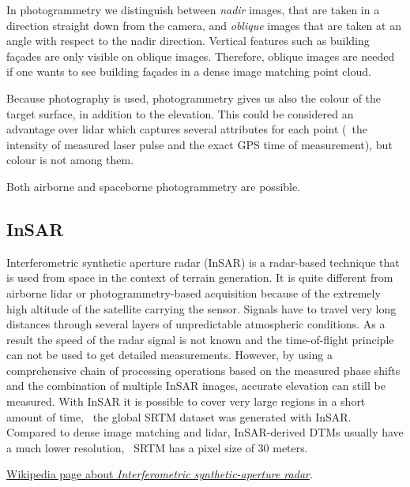 In photogrammetry we distinguish between \emph{nadir} images, 
that are taken in a direction straight down from the camera, and \emph{oblique}
images that are taken at an angle with respect to the nadir direction.
Vertical features such as building façades are only visible on oblique images.
Therefore, oblique images are needed if one wants to see building façades in a dense image matching point cloud.

Because photography is used, photogrammetry gives us also the colour of the target surface, in addition to the elevation.
This could be considered an advantage over lidar which captures several attributes for each point (\eg\ the intensity of measured laser pulse and the exact GPS time of measurement), but colour is not among them.

Both airborne and spaceborne photogrammetry are possible.

\subsection{InSAR}

Interferometric synthetic aperture radar (InSAR) is a radar-based technique that is used from space in the context of terrain generation. 
It is quite different from airborne lidar or photo\-gramme\-try-based acquisition because of the extremely high altitude of the satellite carrying the sensor. 
Signals have to travel very long distances through several layers of unpredictable atmospheric conditions. 
As a result the speed of the radar signal is not known and the time-of-flight principle can not be used to get detailed measurements. 
However, by using a comprehensive chain of processing operations based on the measured phase shifts and the combination of multiple InSAR images, accurate elevation can still be measured. 
With InSAR it is possible to cover very large regions in a short amount of time, \eg\ the global SRTM dataset was generated with InSAR\@. 
Compared to dense image matching and lidar, InSAR-derived DTMs usually have a much lower resolution, \eg\ SRTM has a pixel size of 30 meters.

\begin{kaobox-toread}[frametitle=\faExternalLink\ To read or to watch]
	\href{https://en.wikipedia.org/wiki/Interferometric_synthetic-aperture_radar}{Wikipedia page about \emph{Interferometric synthetic-aperture radar}}.
\end{kaobox-toread}


